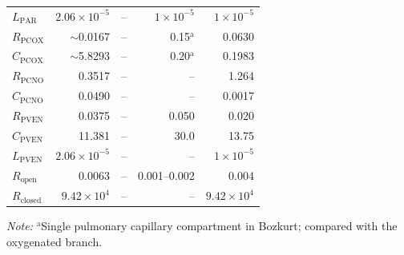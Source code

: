 \documentclass{article}
\begin{document}
\begin{table}[H]
\begin{tabular}{lrrrr}
$L_{\mathrm{PAR}}$ & $2.06\times10^{-5}$ & -- & $1\times10^{-5}$ & $1\times10^{-5}$ \\
$R_{\mathrm{PCOX}}$ & $\sim$0.0167 & -- & 0.15$^{\mathrm{a}}$ & 0.0630 \\
$C_{\mathrm{PCOX}}$ & $\sim$5.8293 & -- & 0.20$^{\mathrm{a}}$ & 0.1983 \\
$R_{\mathrm{PCNO}}$ & 0.3517 & -- & -- & 1.264 \\
$C_{\mathrm{PCNO}}$ & 0.0490 & -- & -- & 0.0017 \\
$R_{\mathrm{PVEN}}$ & 0.0375 & -- & 0.050 & 0.020 \\
$C_{\mathrm{PVEN}}$ & 11.381 & -- & 30.0 & 13.75 \\
$L_{\mathrm{PVEN}}$ & $2.06\times10^{-5}$ & -- & -- & $1\times10^{-5}$ \\
$R_{\mathrm{open}}$ & 0.0063 & -- & 0.001--0.002 & 0.004 \\
$R_{\mathrm{closed}}$ & $9.42\times10^{4}$ & -- & -- & $9.42\times10^{4}$ \\
\bottomrule
\end{tabular}
\par\vspace{2pt}
{\footnotesize \emph{Note:} $^{\mathrm{a}}$Single pulmonary capillary compartment in Bozkurt; compared with the oxygenated branch.}
\end{table}
\end{document}
